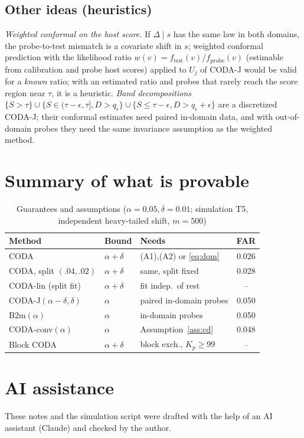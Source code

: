 \documentclass[conference]{IEEEtran}
\theoremstyle{definition}
\theoremstyle{remark}
\begin{document}
\subsection{Other ideas (heuristics)}
\emph{Weighted conformal on the host score.} If $\Delta\mid s$ has the same law in both domains, the probe-to-test mismatch is a covariate shift in $s$; weighted conformal prediction \cite{tibshirani2019} with the likelihood ratio $w(v)=f_{\mathrm{test}}(v)/f_{\mathrm{probe}}(v)$ (estimable from calibration and probe host scores) applied to $U_j$ of CODA-J would be valid for a \emph{known} ratio; with an estimated ratio and probes that rarely reach the score region near $\tau$, it is a heuristic. \emph{Band decompositions} $\{S>\tau\}\cup\{S\in(\tau-\epsilon,\tau],D>q_\epsilon\}\cup\{S\le\tau-\epsilon,D>q_\epsilon+\epsilon\}$ are a discretized CODA-J; their conformal estimates need paired in-domain data, and with out-of-domain probes they need the same invariance assumption as the weighted method.

\section{Summary of what is provable}
\begin{table}[h]\centering\footnotesize
\caption{Guarantees and assumptions ($\alpha=0.05,\delta=0.01$; simulation T5, independent heavy-tailed shift, $m=500$)}
\begin{tabular}{@{}lllc@{}}\toprule
Method & Bound & Needs & FAR\\\midrule
CODA & $\alpha+\delta$ & (A1),(A2) or \eqref{eq:dom} & 0.026\\
CODA, split $(.04,.02)$ & $\alpha+\delta$ & same, split fixed & 0.028\\
CODA-lin (split fit) & $\alpha+\delta$ & fit indep.\ of rest & --\\
CODA-J$(\alpha-\delta,\delta)$ & $\alpha$ & paired in-domain probes & 0.050\\
B2m$(\alpha)$ & $\alpha$ & in-domain probes & 0.050\\
CODA-conv$(\alpha)$ & $\alpha$ & Assumption~\ref{ass:cd} & 0.048\\
Block CODA & $\alpha+\delta$ & block exch., $K_p\ge99$ & --\\\bottomrule
\end{tabular}
\end{table}

\section*{AI assistance}
These notes and the simulation script were drafted with the help of an AI assistant (Claude) and checked by the author.
\end{document}
